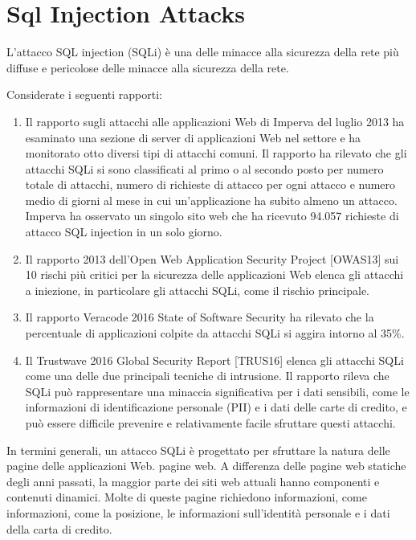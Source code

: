\section{Sql Injection Attacks}
L'attacco SQL injection (SQLi) è una delle minacce alla sicurezza della rete più diffuse e pericolose delle minacce alla sicurezza della rete. 

\singlespacing

Considerate i seguenti rapporti:

\begin{enumerate}
    \item Il rapporto sugli attacchi alle applicazioni Web di Imperva del luglio 2013 ha esaminato una sezione di server di applicazioni Web nel settore e ha monitorato otto diversi tipi di attacchi comuni. Il rapporto ha rilevato che gli attacchi SQLi si sono classificati al primo o al secondo posto per numero totale di attacchi, numero di richieste di attacco per ogni attacco e numero medio di giorni al mese in cui un'applicazione ha subito almeno un attacco. Imperva ha osservato un singolo sito web che ha ricevuto 94.057 richieste di attacco SQL injection in un solo giorno.
    
    \item Il rapporto 2013 dell'Open Web Application Security Project [OWAS13] sui 10 rischi più critici per la sicurezza delle applicazioni Web elenca gli attacchi a iniezione, in particolare gli attacchi SQLi, come il rischio principale.
    
    \item  Il rapporto Veracode 2016 State of Software Security ha rilevato che la percentuale di applicazioni colpite da attacchi SQLi si aggira intorno al 35\%.
    
    \item Il Trustwave 2016 Global Security Report [TRUS16] elenca gli attacchi SQLi come una delle due principali tecniche di intrusione. Il rapporto rileva che SQLi può rappresentare una minaccia significativa per i dati sensibili, come le informazioni di identificazione personale (PII) e i dati delle carte di credito, e può essere difficile prevenire e relativamente facile sfruttare questi attacchi.
\end{enumerate}
In termini generali, un attacco SQLi è progettato per sfruttare la natura delle pagine delle applicazioni Web.
pagine web. A differenza delle pagine web statiche degli anni passati, la maggior parte dei siti web attuali hanno componenti e contenuti dinamici. Molte di queste pagine richiedono informazioni, come informazioni, come la posizione, le informazioni sull'identità personale e i dati della carta di credito. 

